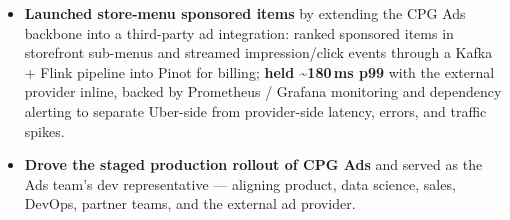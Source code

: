 \documentclass{resume}
\begin{document}
\begin{itemize}
  \item \textbf{Launched store-menu sponsored items} by extending the CPG Ads backbone into a third-party ad integration: ranked sponsored items in storefront sub-menus and streamed impression/click events through a Kafka + Flink pipeline into Pinot for billing; \textbf{held \textasciitilde180\,ms p99} with the external provider inline, backed by Prometheus / Grafana monitoring and dependency alerting to separate Uber-side from provider-side latency, errors, and traffic spikes.
  \item \textbf{Drove the staged production rollout of CPG Ads} and served as the Ads team's dev representative --- aligning product, data science, sales, DevOps, partner teams, and the external ad provider.
\end{itemize}
\end{document}
